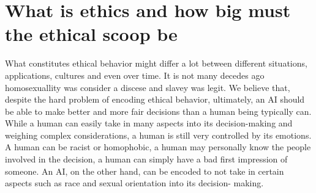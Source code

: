 \documentclass[11pt]{article}
\begin{document}
\section{What is ethics and how big must the ethical scoop be}
What constitutes ethical behavior might differ a
lot between different situations, applications, cultures and even over time. 
It is not many decedes ago homosexuallity was consider a discese and slavey was legit.
We believe that, despite the hard problem of encoding ethical behavior,
ultimately, an AI should be able to make better and more fair decisions than a
human being typically can. While a human can easily take in many aspects into
its decision-making and weighing complex considerations, a human is still very
controlled by its emotions. A human can be racist or homophobic, a human may
personally know the people involved in the decision, a human can simply have a
bad first impression of someone. An AI, on the other hand, can be encoded to not
take in certain aspects such as race and sexual orientation into its decision-
making. 

\end{document}
